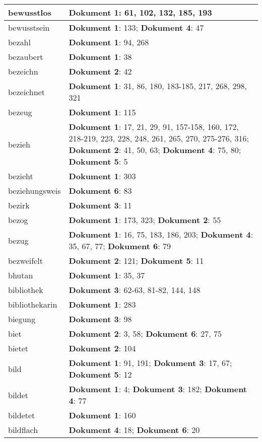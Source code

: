 \documentclass[a5paper]{article}
\begin{document}
\begin{longtable}[l]{|l|p{3in}|}
\hline
bewusstlos & \textbf{Dokument 1}: 61, 102, 132, 185, 193 \\
\hline
bewusstsein & \textbf{Dokument 1}: 133; \textbf{Dokument 4}: 47 \\
\hline
bezahl & \textbf{Dokument 1}: 94, 268 \\
\hline
bezaubert & \textbf{Dokument 1}: 38 \\
\hline
bezeichn & \textbf{Dokument 2}: 42 \\
\hline
bezeichnet & \textbf{Dokument 1}: 31, 86, 180, 183-185, 217, 268, 298, 321 \\
\hline
bezeug & \textbf{Dokument 1}: 115 \\
\hline
bezieh & \textbf{Dokument 1}: 17, 21, 29, 91, 157-158, 160, 172, 218-219, 223, 228, 248, 261, 265, 270, 275-276, 316; \textbf{Dokument 2}: 41, 50, 63; \textbf{Dokument 4}: 75, 80; \textbf{Dokument 5}: 5 \\
\hline
bezieht & \textbf{Dokument 1}: 303 \\
\hline
beziehungsweis & \textbf{Dokument 6}: 83 \\
\hline
bezirk & \textbf{Dokument 3}: 11 \\
\hline
bezog & \textbf{Dokument 1}: 173, 323; \textbf{Dokument 2}: 55 \\
\hline
bezug & \textbf{Dokument 1}: 16, 75, 183, 186, 203; \textbf{Dokument 4}: 35, 67, 77; \textbf{Dokument 6}: 79 \\
\hline
bezweifelt & \textbf{Dokument 2}: 121; \textbf{Dokument 5}: 11 \\
\hline
bhutan & \textbf{Dokument 1}: 35, 37 \\
\hline
bibliothek & \textbf{Dokument 3}: 62-63, 81-82, 144, 148 \\
\hline
bibliothekarin & \textbf{Dokument 1}: 283 \\
\hline
biegung & \textbf{Dokument 3}: 98 \\
\hline
biet & \textbf{Dokument 2}: 3, 58; \textbf{Dokument 6}: 27, 75 \\
\hline
bietet & \textbf{Dokument 2}: 104 \\
\hline
bild & \textbf{Dokument 1}: 91, 191; \textbf{Dokument 3}: 17, 67; \textbf{Dokument 5}: 12 \\
\hline
bildet & \textbf{Dokument 1}: 4; \textbf{Dokument 3}: 182; \textbf{Dokument 4}: 77 \\
\hline
bildetet & \textbf{Dokument 1}: 160 \\
\hline
bildflach & \textbf{Dokument 4}: 18; \textbf{Dokument 6}: 20 \\

\end{longtable}
\end{document}
